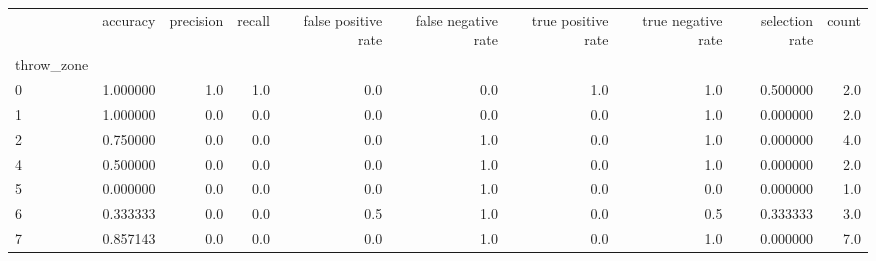 \begin{tabular}{lrrrrrrrrr}
\toprule
{} &  accuracy &  precision &  recall &  false positive rate &  false negative rate &  true positive rate &  true negative rate &  selection rate &  count \\
throw\_zone &           &            &         &                      &                      &                     &                     &                 &        \\
\midrule
0          &  1.000000 &        1.0 &     1.0 &                  0.0 &                  0.0 &                 1.0 &                 1.0 &        0.500000 &    2.0 \\
1          &  1.000000 &        0.0 &     0.0 &                  0.0 &                  0.0 &                 0.0 &                 1.0 &        0.000000 &    2.0 \\
2          &  0.750000 &        0.0 &     0.0 &                  0.0 &                  1.0 &                 0.0 &                 1.0 &        0.000000 &    4.0 \\
4          &  0.500000 &        0.0 &     0.0 &                  0.0 &                  1.0 &                 0.0 &                 1.0 &        0.000000 &    2.0 \\
5          &  0.000000 &        0.0 &     0.0 &                  0.0 &                  1.0 &                 0.0 &                 0.0 &        0.000000 &    1.0 \\
6          &  0.333333 &        0.0 &     0.0 &                  0.5 &                  1.0 &                 0.0 &                 0.5 &        0.333333 &    3.0 \\
7          &  0.857143 &        0.0 &     0.0 &                  0.0 &                  1.0 &                 0.0 &                 1.0 &        0.000000 &    7.0 \\
\bottomrule
\end{tabular}
